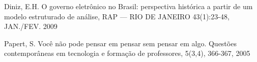 \documentclass[
12pt,		%
openright,	%
twoside,  %
a4paper,			%
chapter=TITLE,		%
english,			%
french,				%
spanish,			%
brazil				%
]{USPSC-classe/USPSC}
\begin{document}
\begin{flushleft}
\begin{flushleft}
\begin{flushleft}
\begin{flushleft}
\begin{flushleft}
\begin{flushleft}
\begin{flushleft}
\begin{flushleft}
\begin{flushleft}
[DINIZ, 2009] Diniz, E.H. O governo eletr\^onico no Brasil: perspectiva hist\'orica a partir de um modelo estruturado de an\'alise, RAP — RIO DE JANEIRO 43(1):23-48, JAN./FEV. 2009
\end{flushleft}


\end{flushleft}


\end{flushleft}


\end{flushleft}


\end{flushleft}


\end{flushleft}


\end{flushleft}


\end{flushleft}


\end{flushleft}


\begin{flushleft}
\begin{flushleft}
\begin{flushleft}
\begin{flushleft}
\begin{flushleft}
\begin{flushleft}
\begin{flushleft}
\begin{flushleft}
\begin{flushleft}
[PAPERT, 2005a] Papert, S. Voc\^e n\~ao pode pensar em pensar sem pensar em algo. Quest\~oes contempor\^aneas em tecnologia e forma\c{c}\~ao de professores, 5(3,4), 366-367, 2005
\end{flushleft}


\end{flushleft}


\end{flushleft}


\end{flushleft}


\end{flushleft}


\end{flushleft}


\end{flushleft}


\end{flushleft}


\end{flushleft}
\end{document}
